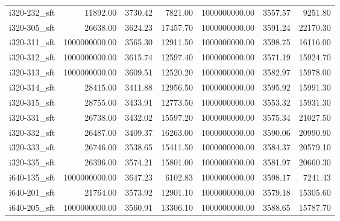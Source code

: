 \begin{tabular}{lrrrrrr}
i320-232\_sft &              11892.00 &                   3730.42 &             7821.00 &      1000000000.00 &                3557.57 &          9251.80 \\
i320-305\_sft &              26638.00 &                   3624.23 &            17457.70 &      1000000000.00 &                3591.24 &         22170.30 \\
i320-311\_sft &         1000000000.00 &                   3565.30 &            12911.50 &      1000000000.00 &                3598.75 &         16116.00 \\
i320-312\_sft &         1000000000.00 &                   3615.74 &            12597.40 &      1000000000.00 &                3571.19 &         15924.70 \\
i320-313\_sft &         1000000000.00 &                   3609.51 &            12520.20 &      1000000000.00 &                3582.97 &         15978.00 \\
i320-314\_sft &              28415.00 &                   3411.88 &            12956.50 &      1000000000.00 &                3595.92 &         15991.30 \\
i320-315\_sft &              28755.00 &                   3433.91 &            12773.50 &      1000000000.00 &                3553.32 &         15931.30 \\
i320-331\_sft &              26738.00 &                   3432.02 &            15597.20 &      1000000000.00 &                3575.34 &         21027.50 \\
i320-332\_sft &              26487.00 &                   3409.37 &            16263.00 &      1000000000.00 &                3590.06 &         20990.90 \\
i320-333\_sft &              26746.00 &                   3538.65 &            15411.50 &      1000000000.00 &                3584.37 &         20579.10 \\
i320-335\_sft &              26396.00 &                   3574.21 &            15801.00 &      1000000000.00 &                3581.97 &         20660.30 \\
i640-135\_sft &         1000000000.00 &                   3647.23 &             6102.83 &      1000000000.00 &                3598.17 &          7241.43 \\
i640-201\_sft &              21764.00 &                   3573.92 &            12901.10 &      1000000000.00 &                3579.18 &         15305.60 \\
i640-205\_sft &         1000000000.00 &                   3560.91 &            13306.10 &      1000000000.00 &                3588.65 &         15787.70 \\

\end{tabular}
